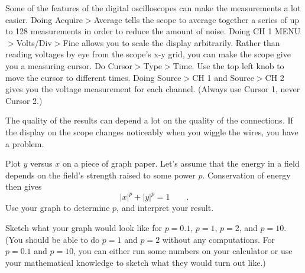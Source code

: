 Some of the features of the digital oscilloscopes can make the measurements
a lot easier. Doing Acquire$>$Average tells the scope to average together
a series of up to 128 measurements in order to reduce the amount of noise.
Doing CH 1 MENU$>$Volts/Div$>$Fine allows you to scale the display arbitrarily.
Rather than reading voltages by eye from the scope's x-y grid, you can make
the scope give you a measuring cursor. Do Cursor$>$Type$>$Time. Use the top
left knob to move the cursor to different times. Doing Source$>$CH 1 and
Source$>$CH 2 gives you the voltage measurement for each channel. (Always use
Cursor 1, never Cursor 2.)

The quality of the results can depend a lot on the quality of the connections.
If the display on the scope changes noticeably when you wiggle the wires,
you have a problem.
 
 \analysis
 Plot $y$ versus $x$ on a piece of graph paper. Let's assume that
 the energy in a field depends on the field's strength raised to
 some power $p$. Conservation of energy then gives
 \begin{equation*}
 	|x|^p+|y|^p = 1 \qquad .
 \end{equation*}
 Use your graph to determine $p$, and interpret your result.
 
 \prelab
 
 \prelabquestion
 Sketch what your graph would look like for $p=0.1$, $p=1$, $p=2$, and $p=10$.
 (You should be able to do $p=1$ and $p=2$ without any computations. For
 $p=0.1$ and $p=10$, you can either run some numbers on your calculator or
 use your mathematical knowledge to sketch what they would turn out like.)
